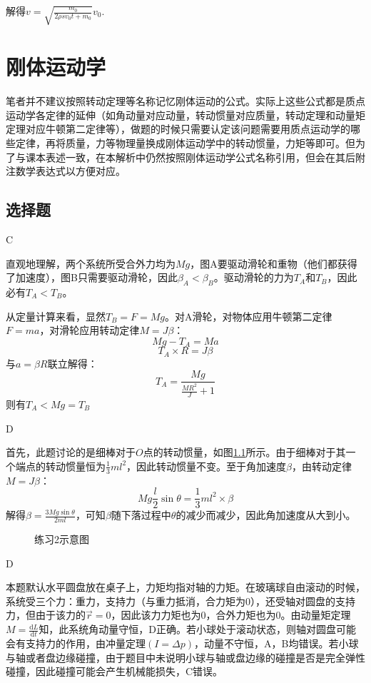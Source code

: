 \documentclass[b5paper,opensource,sourcefont,parskip]{qyxf-book}
\newcommand{\di}[1]{\mathrm{d}#1}
\newcommand{\dy}[2]{\frac{\di{#1}}{\di{#2}}}
\begin{document}
解得$v=\sqrt{\frac{m_0}{2\rho sv_0 t+m_0}}v_0$.


\chapter{刚体运动学}
\note 笔者并不建议按照转动定理等名称记忆刚体运动的公式。实际上这些公式都是质点运动学各定律的延伸（如角动量对应动量，转动惯量对应质量，转动定理和动量矩定理对应牛顿第二定律等），做题的时候只需要认定该问题需要用质点运动学的哪些定律，再将质量，力等物理量换成刚体运动学中的转动惯量，力矩等即可。但为了与课本表述一致，在本解析中仍然按照刚体运动学公式名称引用，但会在其后附注数学表达式以方便对应。

\section{选择题}
C

\solve 直观地理解，两个系统所受合外力均为$ Mg $，图A要驱动滑轮和重物（他们都获得了加速度），图B只需要驱动滑轮，因此$ \beta_A<\beta_B $。驱动滑轮的力为$ T_A $和$ T_B $，因此必有$ T_A<T_B $。

从定量计算来看，显然$ T_B=F=Mg $。对A滑轮，对物体应用牛顿第二定律$F=ma$，对滑轮应用转动定律$M=J\beta$：
\[Mg-T_A=Ma\]
\[T_A\times R=J\beta\]
与$ a=\beta R $联立解得：
\[T_A=\frac{Mg}{\frac{MR^2}{J}+1}\]
则有$ T_A< Mg=T_B$

D

\solve 首先，此题讨论的是细棒对于$ O $点的转动惯量，如图\ref{fig:c4-t2}所示。由于细棒对于其一个端点的转动惯量恒为$ \frac{1}{3}ml^2 $，因此转动惯量不变。至于角加速度$ \beta $，由转动定律$M=J\beta$：
\[Mg\frac{l}{2}\sin\theta=\frac{1}{3}ml^2\times\beta\]
解得$ \beta=\frac{3Mg\sin\theta}{2ml} $，可知$ \beta $随下落过程中$ \theta $的减少而减少，因此角加速度从大到小。

\begin{figure}[htbp]
	\centering
	\caption{练习2示意图}\label{fig:c4-t2}
\end{figure}

D

\solve 本题默认水平圆盘放在桌子上，力矩均指对轴的力矩。在玻璃球自由滚动的时候，系统受三个力：重力，支持力（与重力抵消，合力矩为0），还受轴对圆盘的支持力，但由于该力的$ \vec{r}=0 $，因此该力力矩也为0，合外力矩也为0。由动量矩定理$ M=\dy{L}{t} $知，此系统角动量守恒，D正确。若小球处于滚动状态，则轴对圆盘可能会有支持力的作用，由冲量定理$ (I=\Delta p) $，动量不守恒，A，B均错误。若小球与轴或者盘边缘碰撞，由于题目中未说明小球与轴或盘边缘的碰撞是否是完全弹性碰撞，因此碰撞可能会产生机械能损失，C错误。
\end{document}
